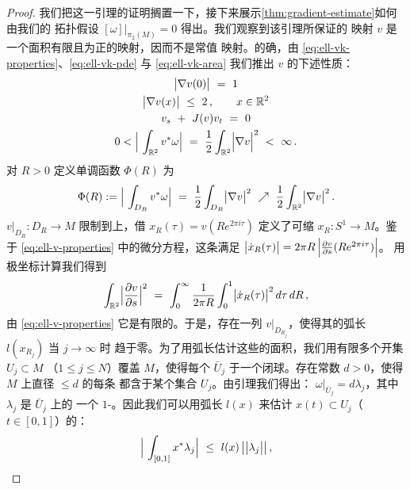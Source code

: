 \begin{proof}
我们把这一引理的证明搁置一下，接下来展示\cref{thm:gradient-estimate}如何由我们的%
拓扑假设 $[\omega]\big|_{\pi_{2}(M)}=0$ 得出。我们观察到该引理所保证的%
\trSmooth{}映射 $v$ 是一个面积有限且为正的\trHolomorphic{}映射，因而不是常值%
映射。的确，由 \eqref{eq:ell-vk-properties}、\eqref{eq:ell-vk-pde} 与%
\eqref{eq:ell-vk-area} 我们推出 $v$ 的下述性质：
\begin{equation}\label{eq:ell-v-properties}
\begin{gathered}
\bigl|\nabla v(0)\bigr|\ =\ 1\\
\bigl|\nabla v(x)\bigr|\ \leq\ 2\,,\qquad x\in\R^{2}\\
v_{s}\ +\ J(v)v_{t}\ =\ 0\\
0<\Bigl|\ \int_{\R^{2}}v^{*}\omega\Bigr|\ =\ \frac{1}{2}\int_{\R^{2}}\Bigl|\nabla v\Bigr|^{2}\ <\ \infty\,.
\end{gathered}
\end{equation}
对 $R>0$ 定义单调函数 $\Phi(R)$ 为
\begin{equation}\label{eq:ell-monotone-phi}
\Phi(R):=\Bigl|\ \int_{D_{R}}v^{*}\omega\Bigr|\ =\ \frac{1}{2}\int_{D_{R}}\bigl|\nabla v\bigr|^{2}\ \nearrow\ \frac{1}{2}\int_{\R^{2}}\bigl|\nabla v\bigr|^{2}\,.
\end{equation}
\trHolomorphic\trDisc{} $v\big|_{D_{R}}:D_{R}\to M$ 限制到\trBoundary{}上，借%
$x_{R}(\tau)=v(Re^{2\pi i\tau})$ 定义了可缩\trLoop{} $x_{R}:S^{1}\to M$。鉴于%
\eqref{eq:ell-v-properties} 中的微分方程，这条\trLoop{}满足%
$\bigl|\dot{x}_{R}(\tau)\bigr|=2\pi R\,\Bigl|\tfrac{\partial v}{\partial s}(Re^{2\pi i\tau})\Bigr|$。%
用极坐标计算我们得到
\[
\int_{\mathbb{R}^{2}}\Bigl|\frac{\partial v}{\partial s}\Bigr|^{2}\ =\ \int_{0}^{\infty}\frac{1}{2\pi R}\int_{0}^{1}\bigl|\dot{x}_{R}(\tau)\bigr|^{2}\,d\tau\,dR\,,
\]
由 \eqref{eq:ell-v-properties} 它是有限的。于是，存在一列\trHolomorphic\trDisc%
$v\big|_{D_{R_{j}}}$，使得其\trBoundary{}的弧长 $l(x_{R_{j}})$ 当 $j\to\infty$ 时%
趋于零。为了用弧长估计这些\trDisc{}的面积，我们用有限多个开集 $U_{j}\subset M$%
（$1\leq j\leq N$）覆盖\trCompact\trManifold{} $M$，使得每个 $\bar{U}_{j}$%
\trDiffeomorphic{}于一个闭球。存在常数 $d>0$，使得 $M$ 上直径 $\leq d$ 的每条%
\trLoop{}都含于某个集合 $U_{j}$。由\trPoincare{}引理我们得出：%
$\omega\big|_{\bar{U}_{j}}=d\lambda_{j}$，其中 $\lambda_{j}$ 是 $\bar{U}_{j}$ 上的%
一个 $1$-\trOneForm。因此我们可以用弧长 $l(x)$ 来估计\trLoop{}%
$x(t)\subset U_{j}$（$t\in[0,1]$）的\trAction：
\begin{equation}\label{eq:ell-action-loop-bound}
\Bigl|\ \int_{[0,1]}x^{*}\lambda_{j}\Bigr|\ \leq\ l(x)\,\bigl|\bigl|\lambda_{j}\bigr|\bigr|\,,

\end{equation}
\end{proof}
